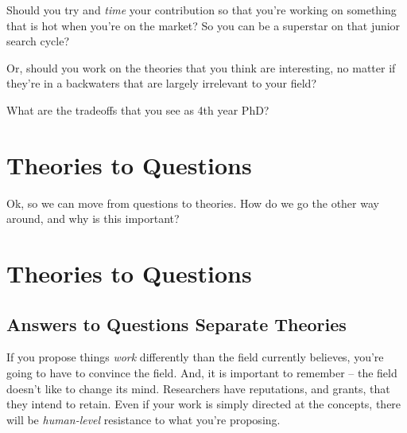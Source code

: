 \documentclass[
  letterpaper,
  DIV=11,
  numbers=noendperiod]{scrreprt}
\begin{document}
\begin{tcolorbox}[enhanced jigsaw, titlerule=0mm, colback=white, toptitle=1mm, toprule=.15mm, bottomtitle=1mm, colframe=quarto-callout-note-color-frame, colbacktitle=quarto-callout-note-color!10!white, bottomrule=.15mm, leftrule=.75mm, opacityback=0, title=\textcolor{quarto-callout-note-color}{\faInfo}\hspace{0.5em}{Open Discussion}, opacitybacktitle=0.6, arc=.35mm, rightrule=.15mm, breakable, coltitle=black, left=2mm]

Should you try and \emph{time} your contribution so that you're working
on something that is hot when you're on the market? So you can be a
superstar on that junior search cycle?

Or, should you work on the theories that you think are interesting, no
matter if they're in a backwaters that are largely irrelevant to your
field?

What are the tradeoffs that you see as 4th year PhD?

\end{tcolorbox}


\chapter{Theories to Questions}\label{theories-to-questions}

Ok, so we can move from questions to theories. How do we go the other
way around, and why is this important?


\chapter{Theories to Questions}\label{theories-to-questions-1}

\section{Answers to Questions Separate
Theories}\label{answers-to-questions-separate-theories}

If you propose things \emph{work} differently than the field currently
believes, you're going to have to convince the field. And, it is
important to remember -- the field doesn't like to change its mind.
Researchers have reputations, and grants, that they intend to retain.
Even if your work is simply directed at the concepts, there will be
\emph{human-level} resistance to what you're proposing.
\end{document}
